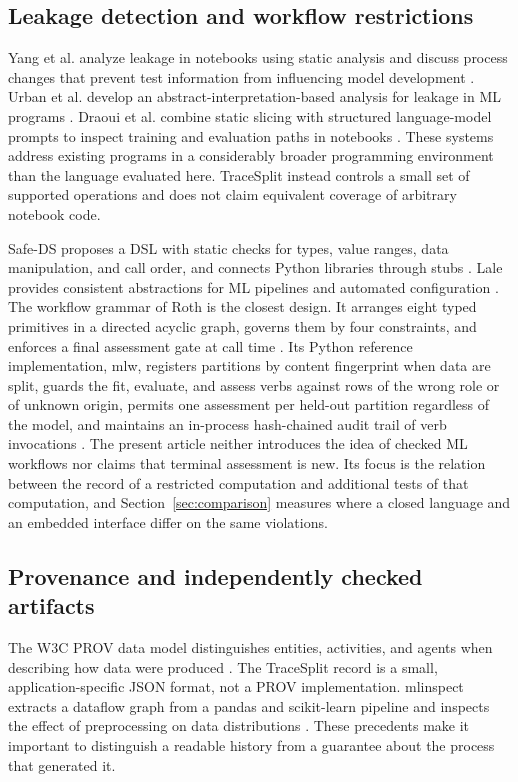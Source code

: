 \documentclass[lettersize,journal]{IEEEtran}
\newcommand{\tool}{TraceSplit}
\begin{document}
\subsection{Leakage detection and workflow restrictions}
Yang et al. analyze leakage in notebooks using static analysis and discuss process changes that prevent test information from influencing model development \cite{yang2022}. Urban et al. develop an abstract-interpretation-based analysis for leakage in ML programs \cite{urban2025}. Draoui et al. combine static slicing with structured language-model prompts to inspect training and evaluation paths in notebooks \cite{draoui2026}. These systems address existing programs in a considerably broader programming environment than the language evaluated here. \tool{} instead controls a small set of supported operations and does not claim equivalent coverage of arbitrary notebook code.

Safe-DS proposes a DSL with static checks for types, value ranges, data manipulation, and call order, and connects Python libraries through stubs \cite{safeds2023}. Lale provides consistent abstractions for ML pipelines and automated configuration \cite{lale2020}. The workflow grammar of Roth is the closest design. It arranges eight typed primitives in a directed acyclic graph, governs them by four constraints, and enforces a final assessment gate at call time \cite{roth2026}. Its Python reference implementation, mlw, registers partitions by content fingerprint when data are split, guards the fit, evaluate, and assess verbs against rows of the wrong role or of unknown origin, permits one assessment per held-out partition regardless of the model, and maintains an in-process hash-chained audit trail of verb invocations \cite{mlw2026}. The present article neither introduces the idea of checked ML workflows nor claims that terminal assessment is new. Its focus is the relation between the record of a restricted computation and additional tests of that computation, and Section~\ref{sec:comparison} measures where a closed language and an embedded interface differ on the same violations.

\subsection{Provenance and independently checked artifacts}
The W3C PROV data model distinguishes entities, activities, and agents when describing how data were produced \cite{prov2013}. The \tool{} record is a small, application-specific JSON format, not a PROV implementation. mlinspect extracts a dataflow graph from a pandas and scikit-learn pipeline and inspects the effect of preprocessing on data distributions \cite{mlinspect2021}. These precedents make it important to distinguish a readable history from a guarantee about the process that generated it.
\end{document}
